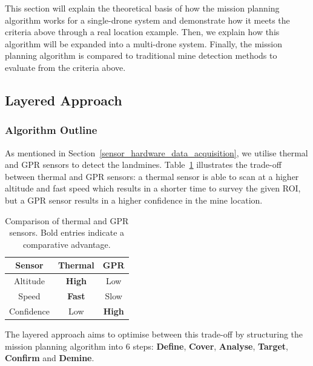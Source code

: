 This section will explain the theoretical basis of how the mission planning algorithm works for a single-drone system and demonstrate how it meets the criteria above through a real location example. Then, we explain how this algorithm will be expanded into a multi-drone system. Finally, the mission planning algorithm is compared to traditional mine detection methods to evaluate from the criteria above.  

\subsection{Layered Approach}
\label{sec:msp_layered_approach}

\subsubsection{Algorithm Outline}

As mentioned in Section~\ref{sensor_hardware_data_acquisition}, we utilise thermal and \gls{GPR} sensors to detect the landmines. Table~\ref{tab:thermal_vs_gpr} illustrates the trade-off between thermal and \gls{GPR} sensors: a thermal sensor is able to scan at a higher altitude and fast speed which results in a shorter time to survey the given \gls{ROI}, but a \gls{GPR} sensor results in a higher confidence in the mine location. 

\begin{table}[h!]
    \centering
    \begin{tabular}{ c |  c  c }
        \hline
        Sensor & Thermal & \gls{GPR} \\
        \hline
        Altitude & \textbf{High} & Low \\
        Speed & \textbf{Fast} & Slow \\
        Confidence & Low & \textbf{High} \\
        \hline
    \end{tabular}
    \caption[Comparison of Thermal and GPR Sensors]
    {Comparison of thermal and \gls{GPR} sensors. Bold entries indicate a comparative advantage.}
    \label{tab:thermal_vs_gpr}
\end{table}

The layered approach aims to optimise between this trade-off by structuring the mission planning algorithm into 6 steps: \textbf{Define}, \textbf{Cover}, \textbf{Analyse}, \textbf{Target}, \textbf{Confirm} and \textbf{Demine}. 

